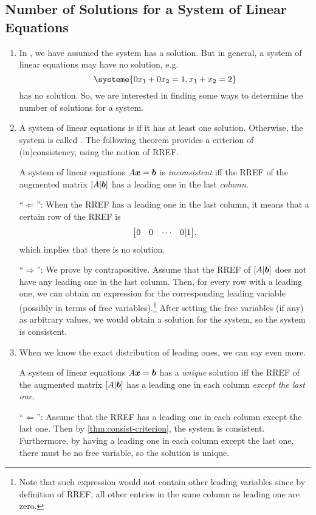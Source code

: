 \subsection{Number of Solutions for a System of Linear Equations}
\label{subsect:sys-sol-num}
\begin{enumerate}
\item In , we have assumed the system has a
solution. But in general, a system of linear equations may have no solution,
e.g.
\[
\systeme{0x_1+0x_2=1,
x_1+x_2=2}
\]
has no solution. So, we are interested in finding some ways to determine the
number of solutions for a system.

\item A system of linear equations is  if it has at least one
solution. Otherwise, the system is called . The following
theorem provides a criterion of (in)consistency, using the notion of RREF.

\begin{theorem}
\label{thm:consist-criterion}
A system of linear equations \(A\vb*{x}=\vb*{b}\) is \emph{inconsistent} iff
the RREF of the augmented matrix \([A|\vb*{b}]\) has a leading one in the last
\emph{column}.
\end{theorem}
\begin{pf}
``\(\Leftarrow\)'': When the RREF has a leading one in the last column, it
means that a certain row of the RREF is
\[
\mqty[0&0&\cdots&0|1],
\]
which implies that there is no solution.

``\(\Rightarrow\)'': We prove by contrapositive. Assume that the RREF of
\([A|\vb*{b}]\) does not have any leading one in the last column. Then, for
every row with a leading one, we can obtain an expression for the corresponding
leading variable (possibly in terms of free variables).\footnote{Note that such
expression would not contain other leading variables since by definition of
RREF, all other entries in the same column as leading one are zero.} After
setting the free variables (if any) as arbitrary values, we would obtain a
solution for the system, so the system is consistent.
\end{pf}

\item When we know the exact distribution of leading ones, we can say even
more.
\begin{corollary}
\label{cor:unique-criterion}
A system of linear equations \(A\vb*{x}=\vb*{b}\) has a \emph{unique}
solution iff the RREF of the augmented matrix \([A|\vb*{b}]\) has a leading
one in each column \emph{except the last one}.
\end{corollary}
\begin{pf}
``\(\Leftarrow\)'': Assume that the RREF has a leading one in each column
except the last one. Then by \cref{thm:consist-criterion}, the system is
consistent. Furthermore, by having a leading one in each column except the
last one, there must be no free variable, so the solution is unique.


\end{pf}
\end{enumerate}
